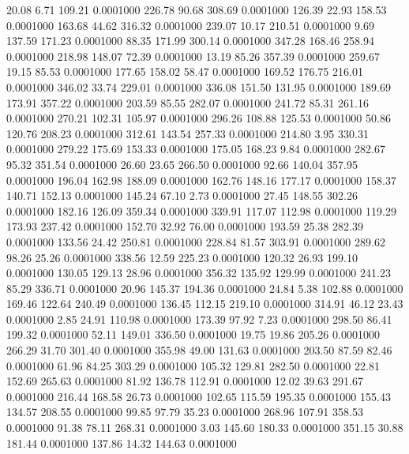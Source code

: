   20.08    6.71  109.21   0.0001000
 226.78   90.68  308.69   0.0001000
 126.39   22.93  158.53   0.0001000
 163.68   44.62  316.32   0.0001000
 239.07   10.17  210.51   0.0001000
   9.69  137.59  171.23   0.0001000
  88.35  171.99  300.14   0.0001000
 347.28  168.46  258.94   0.0001000
 218.98  148.07   72.39   0.0001000
  13.19   85.26  357.39   0.0001000
 259.67   19.15   85.53   0.0001000
 177.65  158.02   58.47   0.0001000
 169.52  176.75  216.01   0.0001000
 346.02   33.74  229.01   0.0001000
 336.08  151.50  131.95   0.0001000
 189.69  173.91  357.22   0.0001000
 203.59   85.55  282.07   0.0001000
 241.72   85.31  261.16   0.0001000
 270.21  102.31  105.97   0.0001000
 296.26  108.88  125.53   0.0001000
  50.86  120.76  208.23   0.0001000
 312.61  143.54  257.33   0.0001000
 214.80    3.95  330.31   0.0001000
 279.22  175.69  153.33   0.0001000
 175.05  168.23    9.84   0.0001000
 282.67   95.32  351.54   0.0001000
  26.60   23.65  266.50   0.0001000
  92.66  140.04  357.95   0.0001000
 196.04  162.98  188.09   0.0001000
 162.76  148.16  177.17   0.0001000
 158.37  140.71  152.13   0.0001000
 145.24   67.10    2.73   0.0001000
  27.45  148.55  302.26   0.0001000
 182.16  126.09  359.34   0.0001000
 339.91  117.07  112.98   0.0001000
 119.29  173.93  237.42   0.0001000
 152.70   32.92   76.00   0.0001000
 193.59   25.38  282.39   0.0001000
 133.56   24.42  250.81   0.0001000
 228.84   81.57  303.91   0.0001000
 289.62   98.26   25.26   0.0001000
 338.56   12.59  225.23   0.0001000
 120.32   26.93  199.10   0.0001000
 130.05  129.13   28.96   0.0001000
 356.32  135.92  129.99   0.0001000
 241.23   85.29  336.71   0.0001000
  20.96  145.37  194.36   0.0001000
  24.84    5.38  102.88   0.0001000
 169.46  122.64  240.49   0.0001000
 136.45  112.15  219.10   0.0001000
 314.91   46.12   23.43   0.0001000
   2.85   24.91  110.98   0.0001000
 173.39   97.92    7.23   0.0001000
 298.50   86.41  199.32   0.0001000
  52.11  149.01  336.50   0.0001000
  19.75   19.86  205.26   0.0001000
 266.29   31.70  301.40   0.0001000
 355.98   49.00  131.63   0.0001000
 203.50   87.59   82.46   0.0001000
  61.96   84.25  303.29   0.0001000
 105.32  129.81  282.50   0.0001000
  22.81  152.69  265.63   0.0001000
  81.92  136.78  112.91   0.0001000
  12.02   39.63  291.67   0.0001000
 216.44  168.58   26.73   0.0001000
 102.65  115.59  195.35   0.0001000
 155.43  134.57  208.55   0.0001000
  99.85   97.79   35.23   0.0001000
 268.96  107.91  358.53   0.0001000
  91.38   78.11  268.31   0.0001000
   3.03  145.60  180.33   0.0001000
 351.15   30.88  181.44   0.0001000
 137.86   14.32  144.63   0.0001000
